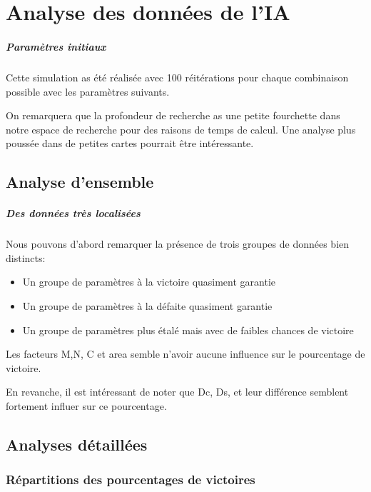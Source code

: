 \chapter{Analyse des données de l'IA}

\paragraph{Paramètres initiaux}
Cette simulation as été réalisée avec 100 réitérations pour chaque combinaison possible avec les paramètres suivants.

\begin{info}
	On remarquera que la profondeur de recherche as une petite fourchette dans notre espace de recherche pour des raisons de temps de calcul. Une analyse plus poussée dans de petites cartes pourrait être intéressante.
\end{info}

\section{Analyse d'ensemble}
\paragraph{Des données très localisées}
Nous pouvons d'abord remarquer la présence de trois groupes de données bien distincts:
\begin{itemize}
	\item Un groupe de paramètres à la victoire quasiment garantie
	\item Un groupe de paramètres à la défaite quasiment garantie
	\item Un groupe de paramètres plus étalé mais avec de faibles chances de victoire
\end{itemize}

Les facteurs M,N, C et area semble n'avoir aucune influence sur le pourcentage de victoire.

En revanche, il est intéressant de noter que Dc, Ds, et leur différence semblent fortement influer sur ce pourcentage.



\section{Analyses détaillées}
\subsection{Répartitions des pourcentages de victoires}

